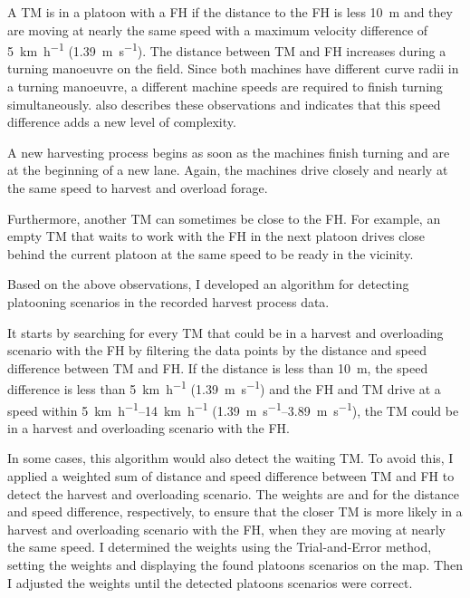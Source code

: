 A \ac{TM} is in a platoon with a \ac{FH} if the distance to the \ac{FH} is less \SI{10}{\metre} and they are moving at
nearly the same speed with a maximum
velocity difference of \SI{5}{\km\per\hour} (\SI{1.39}{\metre\per\second}).
The distance between \ac{TM} and \ac{FH} increases during a turning manoeuvre on the field.
Since both machines have different curve radii in a turning manoeuvre, a different machine speeds are required to
finish turning simultaneously.
\textcite{smolnik_5g_2020} also describes these observations and indicates that this speed difference adds a new
level of complexity.

A new harvesting process begins as soon as the machines finish turning and are at the beginning of a new lane.
Again, the machines drive closely and nearly at the same speed to harvest and overload forage.

Furthermore, another \ac{TM} can sometimes be close to the \ac{FH}.
For example, an empty \ac{TM} that waits to work with the \ac{FH} in the next platoon drives close behind the current
platoon at the same speed to be ready in the vicinity.

Based on the above observations, I developed an algorithm for detecting platooning scenarios in the recorded harvest process data.

It starts by searching for every \ac{TM} that could be in a harvest and overloading scenario with the \ac{FH} by filtering
the data points by the distance and speed difference between \ac{TM} and \ac{FH}.
If the distance is less than \SI{10}{\metre}, the speed difference is less than \SI{5}{\km\per\hour}
(\SI{1.39}{\metre\per\second}) and the \ac{FH} and \ac{TM} drive at a speed within \SIrange{5}{14}{\km\per\hour}
(\SIrange{1.39}{3.89}{\metre\per\second}), the \ac{TM} could be in a harvest and overloading scenario with the \ac{FH}.

In some cases, this algorithm would also detect the waiting \ac{TM}.
To avoid this, I applied a weighted sum of distance and speed difference
between \ac{TM} and \ac{FH} to detect the harvest and overloading scenario.
The weights are  and  for the distance and speed difference, respectively, to ensure that
the closer \ac{TM} is more likely in a harvest and overloading scenario with the \ac{FH}, when they are moving at nearly the same speed.
I determined the weights using the Trial-and-Error method, setting the weights and displaying
the found platoons scenarios on the map.
Then I adjusted the weights until the detected platoons scenarios were correct.

